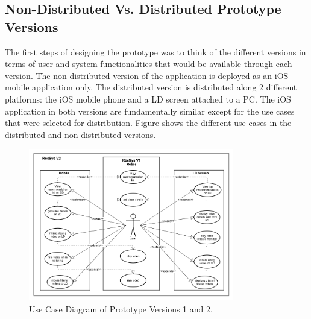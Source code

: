 \subsection{Non-Distributed Vs. Distributed Prototype Versions}
The first steps of designing the prototype was to think of the different versions in terms of user and system functionalities that would be available through each version.
The non-distributed version of the application is deployed as an iOS mobile application only. The distributed version is distributed along 2 different platforms: the iOS mobile phone and a LD screen attached to a PC. The iOS application in both versions are fundamentally similar except for the use cases that were selected for distribution. Figure shows the different use cases in the distributed and non distributed versions.
\begin{figure}[h]
\includegraphics[width=0.8\textwidth, inner, center]{usecase}
\caption{Use Case Diagram of Prototype Versions 1 and 2.}
\label{fig:figure42}
\end{figure}
